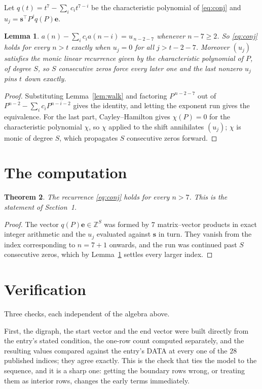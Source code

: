\documentclass[11pt,a4paper]{article}
\theoremstyle{plain}
\newtheorem{theorem}{Theorem}
\newtheorem{lemma}[theorem]{Lemma}
\theoremstyle{definition}
\begin{document}
Let $q(t)=t^{7}-\sum_i c_i t^{7-i}$ be the characteristic polynomial of
\eqref{eq:conj} and $u_j=\mathbf{s}^{\!\top}P^{j}q(P)\mathbf{e}$.

\begin{lemma}\label{lem:crit}
$a(n)-\sum_i c_i a(n-i)=u_{\,n-2-7}$ whenever $n-7\ge2$. So \eqref{eq:conj}
holds for every $n>t$ exactly when $u_j=0$ for all $j>t-2-7$. Moreover $(u_j)$
satisfies the monic linear recurrence given by the characteristic polynomial of $P$, of
degree $S$, so $S$ consecutive zeros force every later one and the last nonzero $u_j$ pins
$t$ down exactly.
\end{lemma}

\begin{proof}
Substituting Lemma~\ref{lem:walk} and factoring $P^{\,n-2-7}$ out of
$P^{n-2}-\sum_i c_i P^{n-i-2}$ gives the identity, and letting the exponent run gives the
equivalence. For the last part, Cayley--Hamilton gives $\chi(P)=0$ for the characteristic
polynomial $\chi$, so $\chi$ applied to the shift annihilates $(u_j)$; $\chi$ is monic of
degree $S$, which propagates $S$ consecutive zeros forward.
\end{proof}

\section{The computation}

\begin{theorem}
The recurrence \eqref{eq:conj} holds for every $n>7$. This is the statement of
Section~1.
\end{theorem}

\begin{proof}
The vector $q(P)\mathbf{e}\in\mathbb{Z}^{S}$ was formed by $7$ matrix--vector
products in exact integer arithmetic and the $u_j$ evaluated against $\mathbf{s}$ in turn.
They vanish from the index corresponding to $n=7+1$ onwards, and the run was continued
past $S$ consecutive zeros, which by Lemma~\ref{lem:crit} settles every larger index.
\end{proof}

\section{Verification}

Three checks, each independent of the algebra above.

First, the digraph, the start vector and the end vector were built directly from the
entry's stated condition, the one-row count computed separately, and the resulting values
compared against the entry's DATA at every one of the $28$ published indices; they
agree exactly. This is the check that ties the model to the sequence, and it is a sharp one:
getting the boundary rows wrong, or treating them as interior rows, changes the early terms
immediately.
\end{document}
